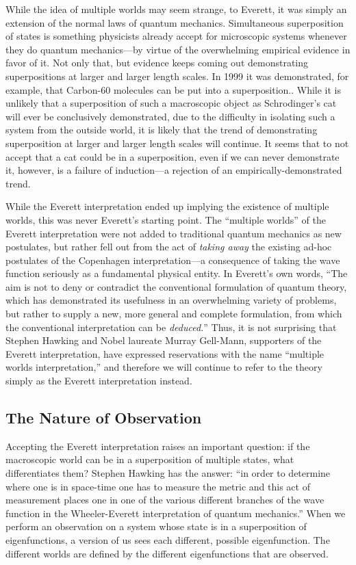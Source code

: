 \documentclass[
    12pt,
    letterpaper,
    aps,
    prd,
    longbibliography,
    twocolumn,
    nofootinbib,
    raggedbottom,
    amsmath,
    amssymb,
    amsfonts,
]{revtex4-1}
\begin{document}
While the idea of multiple worlds may seem strange, to Everett, it was simply an extension of the normal laws of quantum mechanics. Simultaneous superposition of states is something physicists already accept for microscopic systems whenever they do quantum mechanics---by virtue of the overwhelming empirical evidence in favor of it. Not only that, but evidence keeps coming out demonstrating superpositions at larger and larger length scales. In 1999 it was demonstrated, for example, that Carbon-60 molecules can be put into a superposition.\cite{buckyballs}. While it is unlikely that a superposition of such a macroscopic object as Schrodinger's cat will ever be conclusively demonstrated, due to the difficulty in isolating such a system from the outside world, it is likely that the trend of demonstrating superposition at larger and larger length scales will continue. It seems that to not accept that a cat could be in a superposition, even if we can never demonstrate it, however, is a failure of induction---a rejection of an empirically-demonstrated trend.

While the Everett interpretation ended up implying the existence of multiple worlds, this was never Everett's starting point. The ``multiple worlds'' of the Everett interpretation were not added to traditional quantum mechanics as new postulates, but rather fell out from the act of \textit{taking away} the existing ad-hoc postulates of the Copenhagen interpretation---a consequence of taking the wave function seriously as a fundamental physical entity. In Everett's own words, ``The aim is not to deny or contradict the conventional formulation of quantum theory, which has demonstrated its usefulness in an overwhelming variety of problems, but rather to supply a new, more general and complete formulation, from which the conventional interpretation can be \textit{deduced.}''\cite{relativestate} Thus, it is not surprising that Stephen Hawking and Nobel laureate Murray Gell-Mann, supporters of the Everett interpretation, have expressed reservations with the name ``multiple worlds interpretation,'' and therefore we will continue to refer to the theory simply as the Everett interpretation instead.\cite{faq}

\subsection{The Nature of Observation}

Accepting the Everett interpretation raises an important question: if the macroscopic world can be in a superposition of multiple states, what differentiates them? Stephen Hawking has the answer: ``in order to determine where one is in space-time one has to measure the metric and this act of measurement places one in one of the various different branches of the wave function in the Wheeler-Everett interpretation of quantum mechanics.''\cite{hawking} When we perform an observation on a system whose state is in a superposition of eigenfunctions, a version of us sees each different, possible eigenfunction. The different worlds are defined by the different eigenfunctions that are observed.
\end{document}
